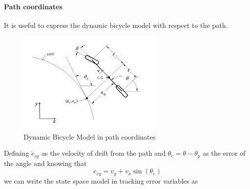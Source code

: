 \documentclass{article}
\begin{document}
\paragraph{Path coordinates} It is useful to express the dynamic bicycle model with respect to the path. 
\begin{figure}[H]
	\centering
    \includegraphics[width=200pt]{path}
    \caption{Dynamic Bicycle Model in path coordinates}
    \label{dynamic}
\end{figure}
Defining $\dot{e}_{cg}$ as the velocity of drift from the path and $\theta_e = \theta - \theta_p$ as the error of the angle and knowing that
\begin{equation}
	\dot{e}_{cg} = v_y + v_x\sin(\theta_e)
\end{equation}
we can write the state space model in tracking error variables as
\end{document}

